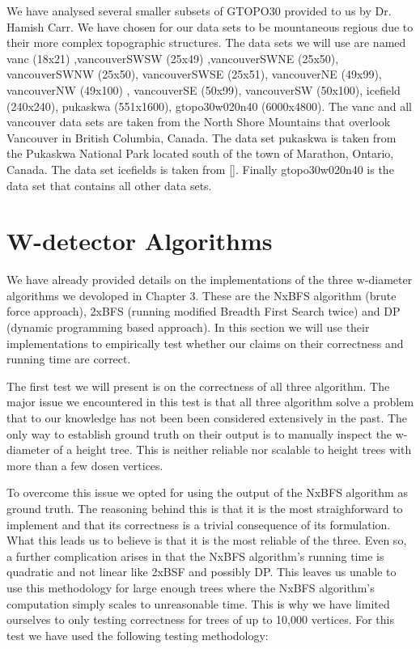 We have analysed several smaller subsets of GTOPO30 provided to us by Dr. Hamish Carr. We have chosen for our data sets to be mountaneous regious due to their more complex topographic structures. The data sets we will use are named vanc (18x21) ,vancouverSWSW (25x49) ,vancouverSWNE (25x50), vancouverSWNW (25x50), vancouverSWSE (25x51), vancouverNE (49x99), vancouverNW (49x100) , vancouverSE (50x99), vancouverSW (50x100), icefield (240x240), pukaskwa (551x1600), gtopo30w020n40 (6000x4800). The vanc and all vancouver data sets are taken from the North Shore Mountains that overlook Vancouver in British Columbia, Canada. The data set pukaskwa is taken from the Pukaskwa National Park located south of the town of Marathon, Ontario, Canada. The data set icefields is taken from []. Finally gtopo30w020n40 is the data set that contains all other data sets.

\section{W-detector Algorithms}

We have already provided details on the implementations of the three w-diameter algorithms we devoloped in Chapter 3. These are the NxBFS algorithm (brute force approach), 2xBFS (running modified Breadth First Search twice) and DP (dynamic programming based approach). In this section we will use their implementations to empirically test whether our claims on their correctness and running time are correct.

The first test we will present is on the correctness of all three algorithm. The major issue we encountered in this test is that all three algorithm solve a problem that to our knowledge has not been been considered extensively in the past. The only way to establish ground truth on their output is to manually inspect the w-diameter of a height tree. This is neither reliable nor scalable to height trees with more than a few dosen vertices.

To overcome this issue we opted for using the output of the NxBFS algorithm as ground truth. The reasoning behind this is that it is the most straighforward to implement and that its correctness is a trivial consequence of its formulation. What this leads us to believe is that it is the most reliable of the three. Even so, a further complication arises in that the NxBFS algorithm's running time is quadratic and not linear like 2xBSF and possibly DP. This leaves us unable to use this methodology for large enough trees where the NxBFS algorithm's computation simply scales to unreasonable time. This is why we have limited ourselves to only testing correctness for trees of up to 10,000 vertices. For this test we have used the following testing methodology:

